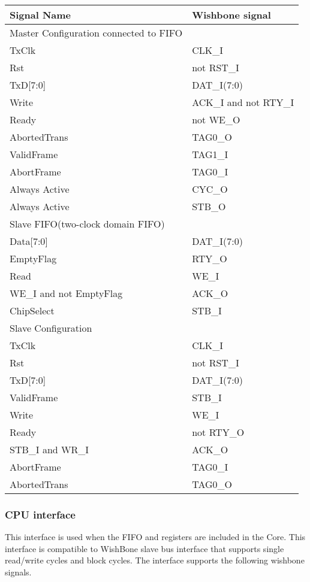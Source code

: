 \documentclass[a4paper,11pt]{article}
\begin{document}
 
\begin{tabular}{|l|l|}
\hline
Signal Name& Wishbone signal\\
\hline
\hline
Master Configuration connected to FIFO&\\
\hline
TxClk & CLK\_I\\
Rst & not RST\_I\\
TxD[7:0]& DAT\_I(7:0)\\
Write& ACK\_I and not RTY\_I\\
Ready& not WE\_O\\
AbortedTrans& TAG0\_O\\
ValidFrame& TAG1\_I\\
AbortFrame& TAG0\_I\\
Always Active & CYC\_O\\
Always Active & STB\_O\\
\hline
Slave FIFO(two-clock domain FIFO)&\\
\hline
Data[7:0]& DAT\_I(7:0)\\
EmptyFlag& RTY\_O\\
Read& WE\_I\\
WE\_I and not EmptyFlag& ACK\_O\\
ChipSelect& STB\_I\\
\hline
Slave Configuration &\\
\hline
TxClk & CLK\_I\\
Rst & not RST\_I\\
TxD[7:0]& DAT\_I(7:0)\\
ValidFrame& STB\_I\\
Write&  WE\_I\\
Ready& not RTY\_O\\
STB\_I and WR\_I& ACK\_O\\
AbortFrame& TAG0\_I\\
AbortedTrans& TAG0\_O\\
\hline
\end{tabular}
 
 
\subsubsection{CPU interface}
This interface is used when the FIFO and registers are included in the Core. This interface is compatible to WishBone slave bus interface that supports single read/write cycles and block cycles. The interface supports the following wishbone signals.
 
\end{document}
